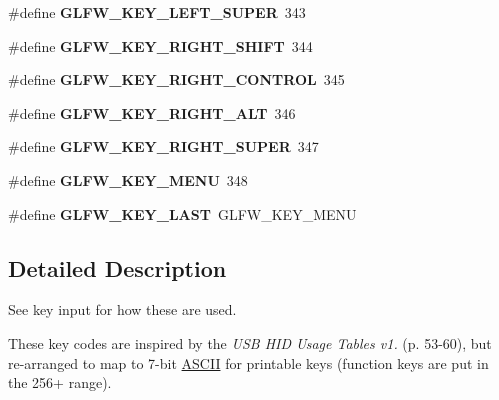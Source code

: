 \begin{DoxyCompactItemize}
\item 
\mbox{\label{group__keys_gafb1207c91997fc295afd1835fbc5641a}} 
\#define {\bfseries G\+L\+F\+W\+\_\+\+K\+E\+Y\+\_\+\+L\+E\+F\+T\+\_\+\+S\+U\+P\+ER}~343
\item 
\mbox{\label{group__keys_gaffca36b99c9dce1a19cb9befbadce691}} 
\#define {\bfseries G\+L\+F\+W\+\_\+\+K\+E\+Y\+\_\+\+R\+I\+G\+H\+T\+\_\+\+S\+H\+I\+FT}~344
\item 
\mbox{\label{group__keys_gad1ca2094b2694e7251d0ab1fd34f8519}} 
\#define {\bfseries G\+L\+F\+W\+\_\+\+K\+E\+Y\+\_\+\+R\+I\+G\+H\+T\+\_\+\+C\+O\+N\+T\+R\+OL}~345
\item 
\mbox{\label{group__keys_ga687b38009131cfdd07a8d05fff8fa446}} 
\#define {\bfseries G\+L\+F\+W\+\_\+\+K\+E\+Y\+\_\+\+R\+I\+G\+H\+T\+\_\+\+A\+LT}~346
\item 
\mbox{\label{group__keys_gad4547a3e8e247594acb60423fe6502db}} 
\#define {\bfseries G\+L\+F\+W\+\_\+\+K\+E\+Y\+\_\+\+R\+I\+G\+H\+T\+\_\+\+S\+U\+P\+ER}~347
\item 
\mbox{\label{group__keys_ga9845be48a745fc232045c9ec174d8820}} 
\#define {\bfseries G\+L\+F\+W\+\_\+\+K\+E\+Y\+\_\+\+M\+E\+NU}~348
\item 
\mbox{\label{group__keys_ga442cbaef7bfb9a4ba13594dd7fbf2789}} 
\#define {\bfseries G\+L\+F\+W\+\_\+\+K\+E\+Y\+\_\+\+L\+A\+ST}~G\+L\+F\+W\+\_\+\+K\+E\+Y\+\_\+\+M\+E\+NU
\end{DoxyCompactItemize}


\subsection{Detailed Description}
See key input for how these are used.

These key codes are inspired by the {\itshape U\+SB H\+ID Usage Tables v1.} (p. 53-\/60), but re-\/arranged to map to 7-\/bit \hyperlink{structASCII}{A\+S\+C\+II} for printable keys (function keys are put in the 256+ range).

